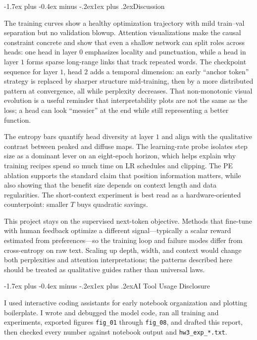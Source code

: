 \documentclass[10pt]{article}
\makeatletter
\renewcommand\section{\@startsection{section}{1}{\z@}%
  {-1.7ex plus -0.4ex minus -.2ex}{1ex plus .2ex}{\normalfont\Large\bfseries}}
\makeatother
\begin{document}
\section{Discussion}

The training curves show a healthy optimization trajectory with mild train--val separation but no validation blowup. Attention visualizations make the causal constraint concrete and show that even a shallow network can split roles across heads: one head in layer $0$ emphasizes locality and punctuation, while a head in layer $1$ forms sparse long-range links that track repeated words. The checkpoint sequence for layer $1$, head $2$ adds a temporal dimension: an early ``anchor token'' strategy is replaced by sharper structure mid-training, then by a more distributed pattern at convergence, all while perplexity decreases. That non-monotonic visual evolution is a useful reminder that interpretability plots are not the same as the loss; a head can look ``messier'' at the end while still representing a better function.

The entropy bars quantify head diversity at layer $1$ and align with the qualitative contrast between peaked and diffuse maps. The learning-rate probe isolates step size as a dominant lever on an eight-epoch horizon, which helps explain why training recipes spend so much time on LR schedules and clipping. The PE ablation supports the standard claim that position information matters, while also showing that the benefit size depends on context length and data regularities. The short-context experiment is best read as a hardware-oriented counterpoint: smaller $T$ buys quadratic savings.

This project stays on the supervised next-token objective. Methods that fine-tune with human feedback optimize a different signal---typically a scalar reward estimated from preferences---so the training loop and failure modes differ from cross-entropy on raw text. Scaling up depth, width, and context would change both perplexities and attention interpretations; the patterns described here should be treated as qualitative guides rather than universal laws.

\section{AI Tool Usage Disclosure}

I used interactive coding assistants for early notebook organization and plotting boilerplate. I wrote and debugged the model code, ran all training and experiments, exported figures \texttt{fig\_01} through \texttt{fig\_08}, and drafted this report, then checked every number against notebook output and \texttt{hw3\_exp\_*.txt}.
\end{document}
